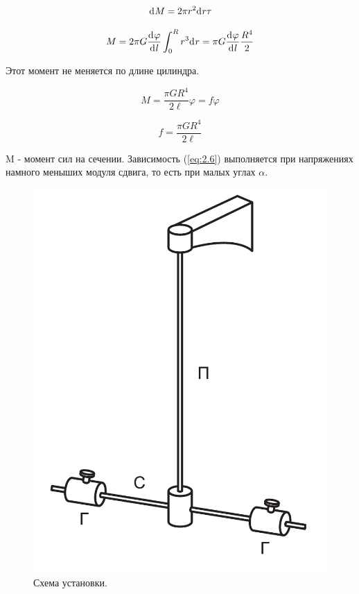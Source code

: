 \documentclass[a4paper,12pt]{article}
\begin{document}
\begin{equation}
  \d{M} = 2\pi r^2 \d{r} \tau \label{eq:2.4}
\end{equation}

\begin{equation}
  M = 2\pi G \deriv{\varphi}{l} \int_0^R{r^3 \d{r}} = 
  \pi G \deriv{\varphi}{l} \frac{R^4}{2} \label{eq:2.5}
\end{equation}

Этот момент не меняется по длине цилиндра.

\begin{equation}
  M = \frac {\pi G R^4}{2\ell} \varphi = f \varphi \label{eq:2.6}
\end{equation}

\begin{equation}
  f = \frac {\pi G R^4}{2\ell} \label{eq:2.7}
\end{equation}

M - момент сил на сечении.
Зависимость (\ref{eq:2.6}) выполняется при напряжениях намного меныших модуля сдвига, то есть при малых углах $\alpha$.

\begin{figure} [h] \center
  \includegraphics[scale = 0.5]{131-132/2 pic 2.png}
  \caption{Схема установки. \label{pic:4}}
\end{figure}
\end{document}
